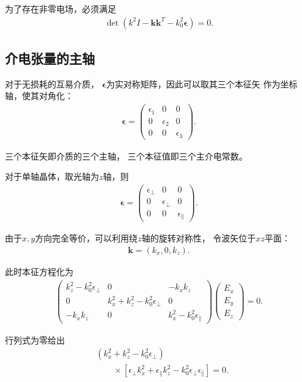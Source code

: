 \documentclass{article}
\begin{document}
为了存在非零电场，必须满足
\begin{align}
    \boxed{
    \det
    \left(
    k^2I-\mathbf k\mathbf k^{T}
    -k_0^2\boldsymbol{\epsilon}
    \right)=0
    }.
\end{align}

\subsection{介电张量的主轴}

对于无损耗的互易介质，
$\boldsymbol{\epsilon}$为实对称矩阵，因此可以取其三个本征矢
作为坐标轴，使其对角化：
\begin{align}
    \boldsymbol{\epsilon}
    =
    \begin{pmatrix}
    \epsilon_1&0&0\\
    0&\epsilon_2&0\\
    0&0&\epsilon_3
    \end{pmatrix}.
\end{align}

三个本征矢即介质的三个主轴，
三个本征值即三个主介电常数。

对于单轴晶体，取光轴为$z$轴，则
\begin{align}
    \boldsymbol{\epsilon}
    =
    \begin{pmatrix}
    \epsilon_\perp&0&0\\
    0&\epsilon_\perp&0\\
    0&0&\epsilon_\parallel
    \end{pmatrix}.
\end{align}

由于$x,y$方向完全等价，可以利用绕$z$轴的旋转对称性，
令波矢位于$xz$平面：
\begin{align}
    \mathbf k=(k_x,0,k_z).
\end{align}

此时本征方程化为
\begin{align}
\begin{pmatrix}
k_z^2-k_0^2\epsilon_\perp
&
0
&
-k_xk_z
\\
0
&
k_x^2+k_z^2-k_0^2\epsilon_\perp
&
0
\\
-k_xk_z
&
0
&
k_x^2-k_0^2\epsilon_\parallel
\end{pmatrix}
\begin{pmatrix}
E_x\\
E_y\\
E_z
\end{pmatrix}
=0.
\end{align}

行列式为零给出
\begin{align}
&
\left(
k_x^2+k_z^2-k_0^2\epsilon_\perp
\right)
\nonumber\\
&\qquad\times
\left[
\epsilon_\perp k_x^2
+\epsilon_\parallel k_z^2
-k_0^2\epsilon_\perp\epsilon_\parallel
\right]
=0.
\end{align}
\end{document}
